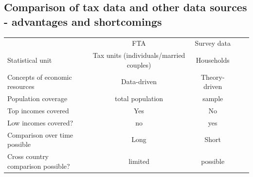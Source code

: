 \documentclass[twoside]{article}\usepackage[]{graphicx}\usepackage[]{color}
\begin{document}
\begin{multicols}{2}
\subsection{Comparison of tax data and other data sources - advantages and shortcomings}



\begin{table}[h]
\begin{tabular}{lcccc}
                                   & FTA       & Survey data\\
Statistical unit                   & Tax units (individuals/married couples)  & Households\\                                   
Concepts of economic resources  & Data-driven   & Theory-driven\\
Population coverage & total population & sample \\ 
Top incomes covered                 & Yes   & No\\
Low incomes covered?               & no        & yes\\
Comparison over time possible 	   & Long       & Short \\
Cross country comparison possible? & limited   & possible
        
\end{tabular}
\end{table}




\end{multicols}
\end{document}
